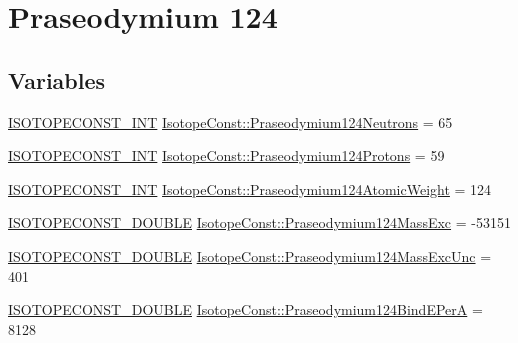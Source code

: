 \hypertarget{group___isotope_const-_praseodymium-_pr124}{}\section{Praseodymium 124}
\label{group___isotope_const-_praseodymium-_pr124}
\subsection*{Variables}
\begin{DoxyCompactItemize}
\item 
\mbox{\hyperlink{group___isotope_const-_macros_ga5f18360b3e99483a35c32d789e62621c}{I\+S\+O\+T\+O\+P\+E\+C\+O\+N\+S\+T\+\_\+\+I\+NT}} \mbox{\hyperlink{group___isotope_const-_praseodymium-_pr124_gac78f81015d299680309a137aff5ea924}{Isotope\+Const\+::\+Praseodymium124\+Neutrons}} = 65
\item 
\mbox{\hyperlink{group___isotope_const-_macros_ga5f18360b3e99483a35c32d789e62621c}{I\+S\+O\+T\+O\+P\+E\+C\+O\+N\+S\+T\+\_\+\+I\+NT}} \mbox{\hyperlink{group___isotope_const-_praseodymium-_pr124_gafff3e7fabfe3f90d0447b74926d7f450}{Isotope\+Const\+::\+Praseodymium124\+Protons}} = 59
\item 
\mbox{\hyperlink{group___isotope_const-_macros_ga5f18360b3e99483a35c32d789e62621c}{I\+S\+O\+T\+O\+P\+E\+C\+O\+N\+S\+T\+\_\+\+I\+NT}} \mbox{\hyperlink{group___isotope_const-_praseodymium-_pr124_ga6c9cfc269d14a764fb9739ff2f50af59}{Isotope\+Const\+::\+Praseodymium124\+Atomic\+Weight}} = 124
\item 
\mbox{\hyperlink{group___isotope_const-_macros_ga8f45a7272ce02c0b4c65c44636ed719a}{I\+S\+O\+T\+O\+P\+E\+C\+O\+N\+S\+T\+\_\+\+D\+O\+U\+B\+LE}} \mbox{\hyperlink{group___isotope_const-_praseodymium-_pr124_gade93f8f20d99c4907a37d96afdb9747c}{Isotope\+Const\+::\+Praseodymium124\+Mass\+Exc}} = -\/53151
\item 
\mbox{\hyperlink{group___isotope_const-_macros_ga8f45a7272ce02c0b4c65c44636ed719a}{I\+S\+O\+T\+O\+P\+E\+C\+O\+N\+S\+T\+\_\+\+D\+O\+U\+B\+LE}} \mbox{\hyperlink{group___isotope_const-_praseodymium-_pr124_ga1ac3b11ffff792ec35916b7164ccadce}{Isotope\+Const\+::\+Praseodymium124\+Mass\+Exc\+Unc}} = 401
\item 
\mbox{\hyperlink{group___isotope_const-_macros_ga8f45a7272ce02c0b4c65c44636ed719a}{I\+S\+O\+T\+O\+P\+E\+C\+O\+N\+S\+T\+\_\+\+D\+O\+U\+B\+LE}} \mbox{\hyperlink{group___isotope_const-_praseodymium-_pr124_ga1c8dd00193fedacada8e82b8e5957ab0}{Isotope\+Const\+::\+Praseodymium124\+Bind\+E\+PerA}} = 8128

\end{DoxyCompactItemize}
